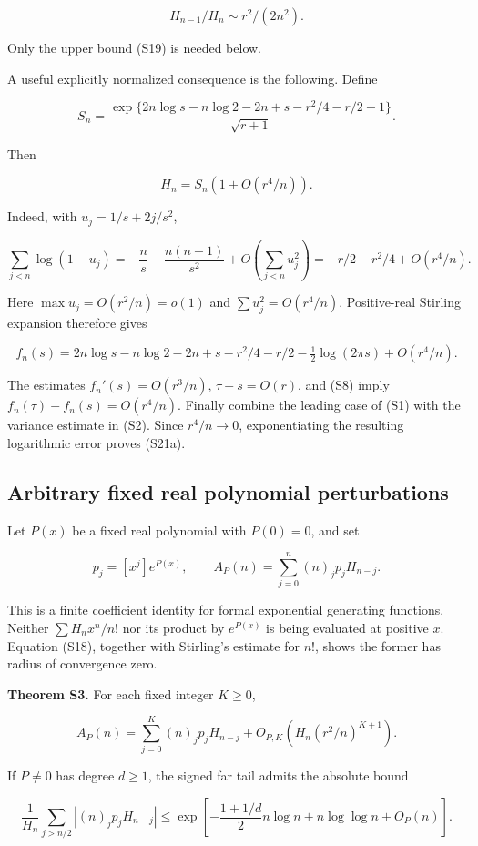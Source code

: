 \[
 H_{n-1}/H_n\sim r^2/(2n^2). \tag{S21}
\]

Only the upper bound (S19) is needed below.

A useful explicitly normalized consequence is the following. Define

\[
 S_n=\frac{\exp\{2n\log s-n\log2-2n+s-r^2/4-r/2-1\}}{\sqrt{r+1}}.
\]

Then

\[
 H_n=S_n\left(1+O(r^4/n)\right). \tag{S21a}
\]

Indeed, with \(u_j=1/s+2j/s^2\),

\[
 \sum_{j<n}\log(1-u_j)
 =-\frac ns-\frac{n(n-1)}{s^2}+O\left(\sum_{j<n}u_j^2\right)
 =-r/2-r^2/4+O(r^4/n).
\]

Here \(\max u_j=O(r^2/n)=o(1)\) and \(\sum u_j^2=O(r^4/n)\).
Positive-real Stirling expansion therefore gives

\[
 f_n(s)=2n\log s-n\log2-2n+s-r^2/4-r/2
       -\tfrac12\log(2\pi s)+O(r^4/n).
\]

The estimates \(f_n'(s)=O(r^3/n)\), \(\tau-s=O(r)\), and (S8) imply
\(f_n(\tau)-f_n(s)=O(r^4/n)\). Finally combine the leading case of (S1)
with the variance estimate in (S2). Since \(r^4/n\to0\), exponentiating
the resulting logarithmic error proves (S21a).

\subsection{Arbitrary fixed real polynomial
perturbations}\label{tcl:arbitrary-fixed-real-polynomial-perturbations}

Let \(P(x)\) be a fixed real polynomial with \(P(0)=0\), and set

\[
 p_j=[x^j]e^{P(x)},\qquad
 A_P(n)=\sum_{j=0}^n(n)_j p_j H_{n-j}.
\]

This is a finite coefficient identity for formal exponential generating
functions. Neither \(\sum H_n x^n/n!\) nor its product by \(e^{P(x)}\)
is being evaluated at positive \(x\). Equation (S18), together with
Stirling's estimate for \(n!\), shows the former has radius of
convergence zero.

\textbf{Theorem S3.} For each fixed integer \(K\ge0\),

\[
 A_P(n)=\sum_{j=0}^K(n)_j p_jH_{n-j}
       +O_{P,K}\left(H_n(r^2/n)^{K+1}\right). \tag{S22}
\]

If \(P\ne0\) has degree \(d\ge1\), the signed far tail admits the
absolute bound

\[
 \frac1{H_n}\sum_{j>n/2}\left|(n)_j p_jH_{n-j}\right|
 \le\exp\left[-\frac{1+1/d}{2}n\log n+n\log\log n+O_P(n)\right]. \tag{S23}
\]

